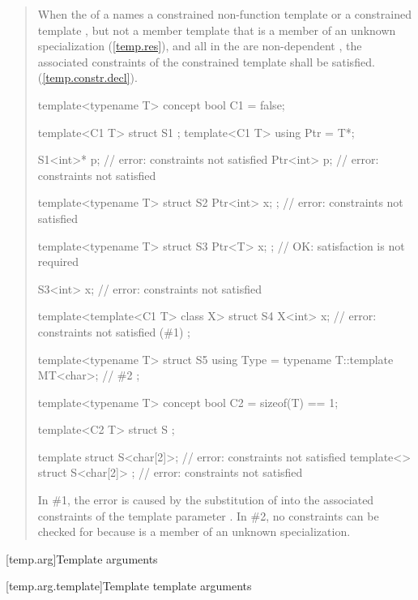 \begin{quote}
\begin{addedblock}
\setcounter{Paras}{7}
\pnum
When the  of a  names
a constrained non-function template or a constrained template 
, but not a member template that is a member 
of an unknown specialization (\ref{temp.res}), and all 
 in the  
are non-dependent , the associated constraints of the 
constrained template shall be satisfied. (\ref{temp.constr.decl}).
% 
\enterexample
\begin{codeblock}
template<typename T> concept bool C1 = false;

template<C1 T> struct S1 { };
template<C1 T> using Ptr = T*;

S1<int>* p; // error: constraints not satisfied
Ptr<int> p; // error: constraints not satisfied

template<typename T>
  struct S2 { Ptr<int> x; }; // error: constraints not satisfied

template<typename T>
  struct S3 { Ptr<T> x; };   // OK: satisfaction is not required

S3<int> x;                   // error: constraints not satisfied

template<template<C1 T> class X>
  struct S4 {
    X<int> x; // error: constraints not satisfied (\#1)
  };

template<typename T>
  struct S5 {
    using Type = typename T::template MT<char>; // \#2
  };

template<typename T> concept bool C2 = sizeof(T) == 1;

template<C2 T> struct S { };

template struct S<char[2]>;       // error: constraints not satisfied
template<> struct S<char[2]> { }; // error: constraints not satisfied
\end{codeblock}
In \#1, the error is caused by the substitution of  into 
the associated constraints of the template parameter .
% 
In \#2, no constraints can be checked for  
because  is a member of an unknown specialization.
\exitexample
\end{addedblock}
\end{quote}

[temp.arg]{Template arguments}

\setcounter{subsection}{2}
[temp.arg.template]{Template template arguments}

